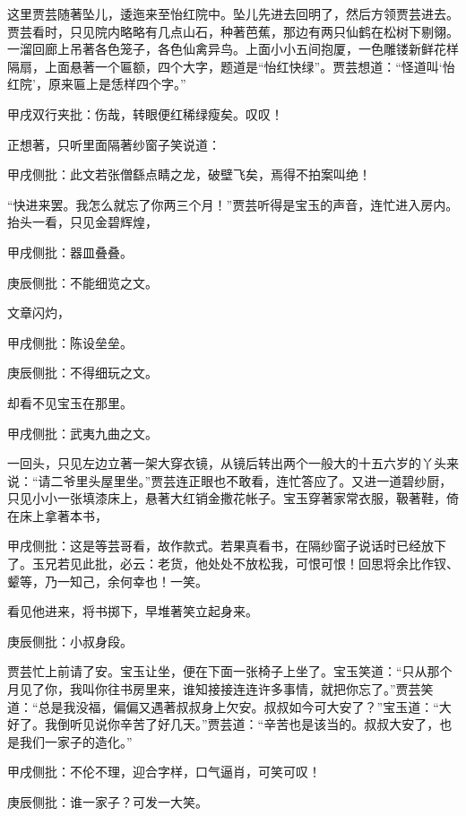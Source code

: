 \begin{parag}


    这里贾芸随著坠儿，逶迤来至怡红院中。坠儿先进去回明了，然后方领贾芸进去。贾芸看时，只见院内略略有几点山石，种著芭蕉，那边有两只仙鹤在松树下剔翎。一溜回廊上吊著各色笼子，各色仙禽异鸟。上面小小五间抱厦，一色雕镂新鲜花样隔扇，上面悬著一个匾额，四个大字，题道是“怡红快绿”。贾芸想道：“怪道叫‘怡红院’，原来匾上是恁样四个字。”\begin{note}甲戌双行夹批：伤哉，转眼便红稀绿瘦矣。叹叹！\end{note}正想著，只听里面隔著纱窗子笑说道：\begin{note}甲戌侧批：此文若张僧繇点睛之龙，破壁飞矣，焉得不拍案叫绝！\end{note}“快进来罢。我怎么就忘了你两三个月！”贾芸听得是宝玉的声音，连忙进入房内。抬头一看，只见金碧辉煌，\begin{note}甲戌侧批：器皿叠叠。\end{note}\begin{note}庚辰侧批：不能细览之文。\end{note}文章闪灼，\begin{note}甲戌侧批：陈设垒垒。\end{note}\begin{note}庚辰侧批：不得细玩之文。\end{note}却看不见宝玉在那里。\begin{note}甲戌侧批：武夷九曲之文。\end{note}一回头，只见左边立著一架大穿衣镜，从镜后转出两个一般大的十五六岁的丫头来说：“请二爷里头屋里坐。”贾芸连正眼也不敢看，连忙答应了。又进一道碧纱厨，只见小小一张填漆床上，悬著大红销金撒花帐子。宝玉穿著家常衣服，靸著鞋，倚在床上拿著本书，\begin{note}甲戌侧批：这是等芸哥看，故作款式。若果真看书，在隔纱窗子说话时已经放下了。玉兄若见此批，必云：老货，他处处不放松我，可恨可恨！回思将余比作钗、颦等，乃一知己，余何幸也！一笑。\end{note}看见他进来，将书掷下，早堆著笑立起身来。\begin{note}庚辰侧批：小叔身段。\end{note}贾芸忙上前请了安。宝玉让坐，便在下面一张椅子上坐了。宝玉笑道：“只从那个月见了你，我叫你往书房里来，谁知接接连连许多事情，就把你忘了。”贾芸笑道：“总是我没福，偏偏又遇著叔叔身上欠安。叔叔如今可大安了？”宝玉道：“大好了。我倒听见说你辛苦了好几天。”贾芸道：“辛苦也是该当的。叔叔大安了，也是我们一家子的造化。”\begin{note}甲戌侧批：不伦不理，迎合字样，口气逼肖，可笑可叹！\end{note}\begin{note}庚辰侧批：谁一家子？可发一大笑。\end{note}
\end{parag}


